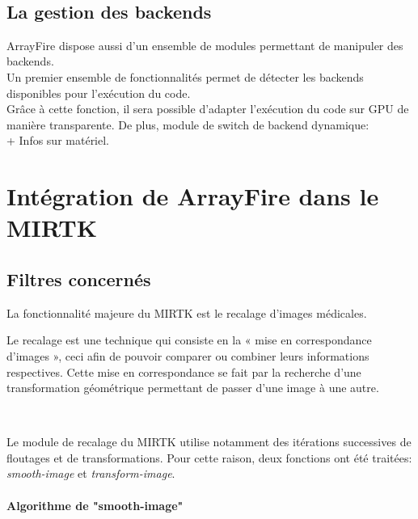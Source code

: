 \documentclass[10pt]{report}
\begin{document}
	~\par 

	\subsection{La gestion des backends}
	
	ArrayFire dispose aussi d'un ensemble de modules permettant de manipuler des backends. \\
	Un premier ensemble de fonctionnalités permet de détecter les backends disponibles pour l'exécution du code.\\ Grâce à cette fonction, il sera possible d'adapter l'exécution du code sur GPU de manière transparente.
	De plus, module de switch de backend dynamique:\\
	+ Infos sur matériel.
	
	
	\section{Intégration de ArrayFire dans le MIRTK}
	\subsection{Filtres concernés}
	La fonctionnalité majeure du MIRTK est le recalage d'images médicales.
	
	Le recalage est une technique qui consiste en la « mise en correspondance d'images », ceci afin de pouvoir comparer ou combiner leurs informations respectives. Cette mise en correspondance se fait par la recherche d'une transformation géométrique permettant de passer d'une image à une autre.
	
	~\par
	Le module de recalage du MIRTK utilise notamment des itérations successives de floutages et de transformations. Pour cette raison, deux fonctions ont été traitées: \textit{smooth-image} et \textit{transform-image}.
	\paragraph{Algorithme de "smooth-image"}
~\par
\end{document}
